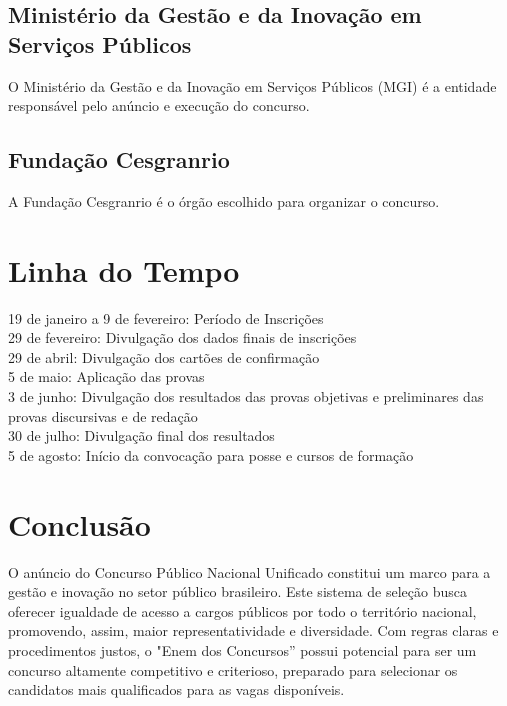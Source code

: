 \documentclass[
   article,       
   12pt,          
   oneside,       
   a4paper,       
   english,       
   brazil,        
   sumario=tradicional
   ]{abntex2}
\begin{document}
\subsection {Ministério da Gestão e da Inovação em Serviços Públicos}
O Ministério da Gestão e da Inovação em Serviços Públicos (MGI) é a entidade responsável pelo anúncio e execução do concurso.
\subsection {Fundação Cesgranrio}
A Fundação Cesgranrio é o órgão escolhido para organizar o concurso. 
\section {Linha do Tempo}
19 de janeiro a 9 de fevereiro: Período de Inscrições \\ 
29 de fevereiro: Divulgação dos dados finais de inscrições \\
29 de abril: Divulgação dos cartões de confirmação \\
5 de maio: Aplicação das provas \\
3 de junho: Divulgação dos resultados das provas objetivas e preliminares das provas discursivas e de redação \\
30 de julho: Divulgação final dos resultados \\
5 de agosto: Início da convocação para posse e cursos de formação
\section {Conclusão} 
O anúncio do Concurso Público Nacional Unificado constitui um marco para a gestão e inovação no setor público brasileiro. Este sistema de seleção busca oferecer igualdade de acesso a cargos públicos por todo o território nacional, promovendo, assim, maior representatividade e diversidade. Com regras claras e procedimentos justos, o "Enem dos Concursos” possui potencial para ser um concurso altamente competitivo e criterioso, preparado para selecionar os candidatos mais qualificados para as vagas disponíveis.


\postextual

\end{document}
